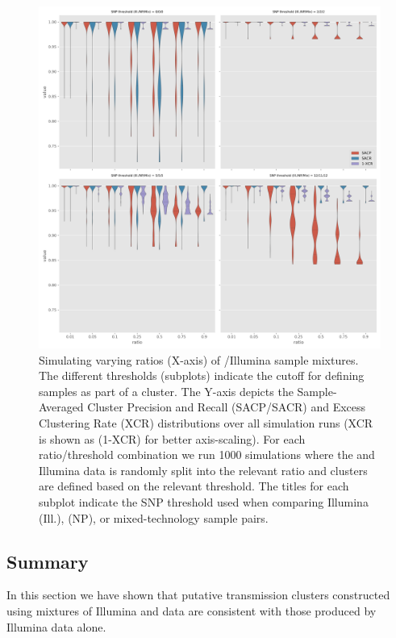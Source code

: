 \begin{figure}
\begin{center}
\includegraphics[width=0.90\columnwidth]{Chapter2/Figs/mixed_simulations.png}
\caption{{Simulating varying ratios (X-axis) of \ont{}/Illumina sample mixtures. The different thresholds (subplots) indicate the cutoff for defining samples as part of a cluster. The Y-axis depicts the Sample-Averaged Cluster Precision and Recall (SACP/SACR) and Excess Clustering Rate (XCR) distributions over all simulation runs (XCR is shown as (1-XCR) for better axis-scaling). For each ratio/threshold combination we run 1000 simulations where the \ont{} and Illumina data is randomly split into the relevant ratio and clusters are defined based on the relevant threshold. The titles for each subplot indicate the SNP threshold used when comparing Illumina (Ill.), \ont{} (NP), or mixed-technology sample pairs.
{\label{fig:mixed-sims}}%
}}
\end{center}
\end{figure}

\subsection{Summary}

In this section we have shown that putative transmission clusters constructed using mixtures of Illumina and \ont{} data are consistent with those produced by Illumina data alone.

